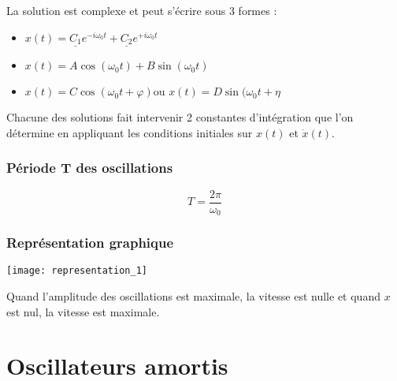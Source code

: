 \documentclass[french]{yLectureNote}
\begin{document}
La solution est complexe et peut s'écrire sous 3 formes :
\begin{theorem}[Solutions d'un OH]
\begin{itemize}
 \item $x(t) = \underline{C_1}e^{-i\omega_0t} + \underline{C_2}e^{+i\omega_0t}$
\item $x(t) = A\cos(\omega_0t) + B\sin(\omega_0t)$
\item $x(t) = C\cos(\omega_0t+\varphi) \text{ou }x(t) = D\sin(\omega_0t+\eta$
\end{itemize}
\end{theorem}
Chacune des solutions fait intervenir 2 constantes d'intégration que l'on détermine en appliquant les conditions initiales sur $x(t)$ et $\dot{x}(t)$.


\subsubsection{Période T des oscillations}
\begin{theorem}[Période]
\[T = \frac{2\pi}{\omega_0}\]
\end{theorem}

\subsubsection{Représentation graphique}
\texttt{[image: representation\_1]}

Quand l'amplitude des oscillations est maximale, la vitesse est nulle et quand $x$ est nul, la vitesse est maximale.
\section{Oscillateurs amortis}
\end{document}
